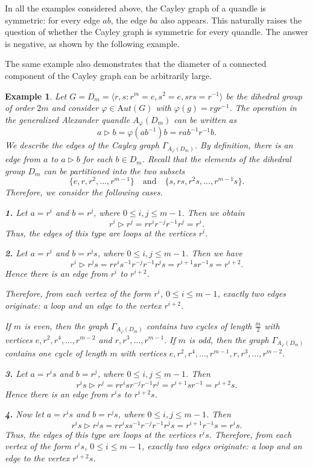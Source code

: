 \documentclass[english,11pt]{amsart}
\newtheorem{Example}[Theorem]{Example}
\newcommand{\Aut}{{\mathrm Aut}}
\begin{document}
In all the examples considered above, the Cayley graph of a quandle is symmetric: for every edge $ab$, the edge $ba$ also appears. This naturally raises the question of whether the Cayley graph is symmetric for every quandle. The answer is negative, as shown by the following example.

The same example also demonstrates that the diameter of a connected component of the Cayley graph can be arbitrarily large.


\begin{Example}
Let $G = D_m = \langle r, s : r^m = e, s^2 = e, srs = r^{-1} \rangle$ be the dihedral group of order $2m$ and consider $\varphi \in \Aut(G)$ with $\varphi(g)=rgr^{-1}$. The operation in the generalized Alexander quandle $A_\varphi(D_m)$ can be written as
\[
a \rhd b = \varphi(ab^{-1})b = rab^{-1}r^{-1}b .
\]
We describe the edges of the Cayley graph $\Gamma_{A_\varphi(D_m)}$. By definition, there is an edge from $a$ to $a \rhd b$ for each $b \in D_m$. Recall that the elements of the dihedral group $D_m$ can be partitioned into the two subsets
\[
\{e, r, r^2, \ldots, r^{m-1}\}
\quad \text{and} \quad
\{s, rs, r^2s, \ldots, r^{m-1}s\}.
\]
Therefore, we consider the following cases.

{\bf 1.} Let $a = r^i$ and $b = r^j$, where $0 \le i,j \le m-1$. Then we obtain
\[
r^i \rhd r^j = r r^i r^{-j} r^{-1} r^j = r^i.
\]
Thus, the edges of this type are loops at the vertices $r^i$. 

{\bf 2.} Let $a = r^i$ and $b = r^j s$, where $0 \le i,j \le m-1$. Then we have
\[
r^i \rhd r^j s = r r^i s^{-1} r^{-j} r^{-1} r^j s
= r^{i+1} s r^{-1} s
= r^{i+2}.
\]
Hence there is an edge from $r^i$ to $r^{i+2}$.

Therefore, from each vertex of the form $r^i$, $0 \le i \le m-1$, exactly two edges originate: a loop and an edge to the vertex $r^{i+2}$.

If $m$ is even, then the graph $\Gamma_{A_\varphi(D_m)}$ contains two cycles of length $\frac{m}{2}$ with vertices
$ e, r^2, r^4, \ldots, r^{m-2} $ and $ r, r^3, \ldots, r^{m-1}.$
If $m$ is odd, then the graph $\Gamma_{A_\varphi(D_m)}$ contains one cycle of length $m$ with vertices $e, r^2, r^4, \ldots, r^{m-1}, r, r^3, \ldots, r^{m-2}.$

{\bf 3.} Let  $a = r^is$ and $b = r^j $, where $0 \le i,j \le m-1$. Then
\[
r^i s\rhd r^j = r r^i s r^{-j} r^{-1} r^j = r^{i+1} s r^{-1} = r^{i+2}s.
\]
Hence there is an edge from $r^is$ to $r^{i+2}s$.


{\bf 4.} Now let $a = r^is$ and $b = r^js $, where $0 \le i,j \le m-1$. Then
\[
r^i s\rhd r^js = r r^i s s^{-1} r^{-j} r^{-1} r^j s = r^{i+1} r^{-1} s= r^{i}s.
\]
Thus, the edges of this type are loops at the vertices $r^is$. 
Therefore, from each vertex of the form $r^i s$, $0 \le i \le m-1$, exactly two edges originate: a loop and an edge to the vertex $r^{i+2}s$.


\end{Example}
\end{document}
